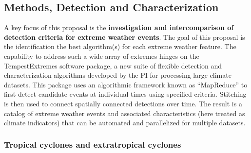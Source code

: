 \documentclass[11pt]{article}
\newcommand\citep{\cite}
\begin{document}


\subsection{Methods, Detection and Characterization} \label{sec:Methods}

A key focus of this proposal is the \textbf{investigation and intercomparison of detection criteria for extreme weather events}.  The goal of this proposal is the identification the best algorithm(s) for each extreme weather feature.  The capability to address such a wide array of extremes hinges on the TempestExtremes software package, a new suite of flexible detection and characterization algorithms developed by the PI for processing large climate datasets. This package uses an algorithmic framework known as ``MapReduce'' to first detect candidate events at individual times using specified criteria. Stitching is then used to connect spatially connected detections over time. The result is a catalog of extreme weather events and associated characteristics (here treated as climate indicators) that can be automated and parallelized for multiple datasets.

\subsubsection{Tropical cyclones and extratropical cyclones}

\end{document}
